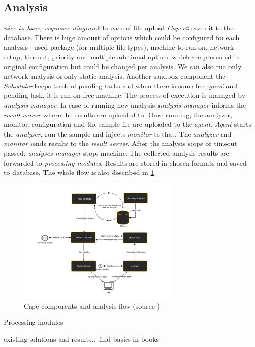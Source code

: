 \subsection{Analysis}
\emph{nice to have, sequence diagram?}
In case of file upload \emph{Capev2} saves it to the database. There is huge amount of options which could be configured for each analysis - used package (for multiple file types), machine to run on, network setup, timeout, priority and multiple addtional options which are presented in original configuration but could be changed per analysis. We can also run only network analysis or only static analysis. Another sandbox component the \emph{Scheduler} keeps track of pending tasks and when there is some free \emph{guest} and pending task, it is run on free machine. The process of execution is managed by \emph{analysis manager}. In case of running new analysis \emph{analysis manager} informs the \emph{result server} where the results are uploaded to. Once running, the analyzer, monitor, configuration and the sample file are uploaded to the \emph{agent}. \emph{Agent} starts the \emph{analyser}, run the sample and injects \emph{monitor} to that. The \emph{analyzer} and \emph{monitor} sends results to the \emph{result server}. After the analysis stops or timeout passed, \emph{analyses manager} stops machine. The collected analysis results are forwarded to \emph{processing modules}. Results are stored in chosen formats and saved to database. \cite{CuckooSa10:online} The whole flow is also described in \ref{fig:capeflow}.

\begin{figure}[h]
  \centering
  \includegraphics[width=8cm]{figures/flow.svg}
  \caption{Cape components and analysis flow (source \cite{CuckooSa10:online})}
  \label{fig:capeflow}
\end{figure}

Processing modules

existing solutions and results...
find basics in books

